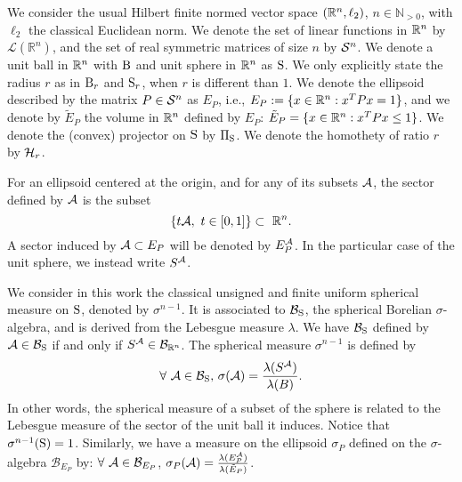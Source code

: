 We consider the usual Hilbert finite normed vector space $(\mathbb{R}^n,\ell_2)$, $n \in \mathbb{N}_{> 0}$, with $\ell_2$ the classical Euclidean norm. We denote the set of linear functions in $\mathbb{R}^n$ by $\mathcal{L}(\mathbb{R}^n)$, and the set of real symmetric matrices of size $n$ by $\mathcal{S}^n$. We denote a unit ball in $\mathbb{R}^n$ with $\text{B}$ and unit sphere in $\mathbb{R}^n$ as $\text{S}$. We only explicitly state the radius $r$ as in $\text{B}_r$ and $\text{S}_r$, when $r$ is different than $1$. We denote the ellipsoid described by the matrix $P \in \mathcal{S}^n$ as $E_P$, i.e., $E_P:= \{x \in \mathbb{R}^n: x^TPx = 1\}$, and we denote by $\tilde{E}_P$ the volume in $\mathbb{R}^n$ defined by $E_P$: $\tilde{E}_P = \{x \in \mathbb{R}^n: x^TPx \leq 1\}$. We denote the (convex) projector on $\text{S}$ by $\Pi_{\text{S}}$. We denote the homothety of ratio $r$ by $\mathcal{H}_{r}$. 


For an ellipsoid centered at the origin, and for any of its subsets $\mathcal{A}$, the sector defined by $\mathcal{A}$ is the subset $$\{t \calA, \ t \in [0,1]\} \subset\ \R^n.$$ A sector induced by $\mathcal{A} \subset E_P$ will be denoted by $E_P^{\mathcal{A}}$. In the particular case of the unit sphere, we instead write $S^{\mathcal{A}}$.

We consider in this work the classical unsigned and finite uniform spherical measure on $\text{S}$, denoted by $\sigma^{n-1}$. It is associated to $\mathcal{B}_{\text{S}}$, the spherical Borelian $\sigma$-algebra, and is derived from the Lebesgue measure $\lambda$. We have $\mathcal{B}_{\text{S}}$ defined by $\mathcal{A} \in \mathcal{B}_{\text{S}}$ if and only if $S^{\mathcal{A}} \in \mathcal{B}_{\mathbb{R}^n}$. The spherical measure $\sigma^{n-1}$ is defined by
$$\forall\ \mathcal{A} \in \mathcal{B}_{\text{S}},\, \sigma(\mathcal{A}) = \frac{\lambda(S^{\mathcal{A}})}{\lambda(B)}. $$
In other words, the spherical measure of a subset of the sphere is related to the Lebesgue measure of the sector of the unit ball it induces. Notice that $\sigma^{n-1}(\text{S}) = 1$.
Similarly, we have a measure on the ellipsoid $\sigma_P$ defined on the $\sigma$-algebra $\mathcal{B}_{E_P}$ by: $\forall\ \mathcal{A} \in \mathcal{B}_{E_P}$, $\sigma_P(\mathcal{A}) = \frac{\lambda(E_P^{\mathcal{A}})}{\lambda(\tilde{E}_P)}$.
